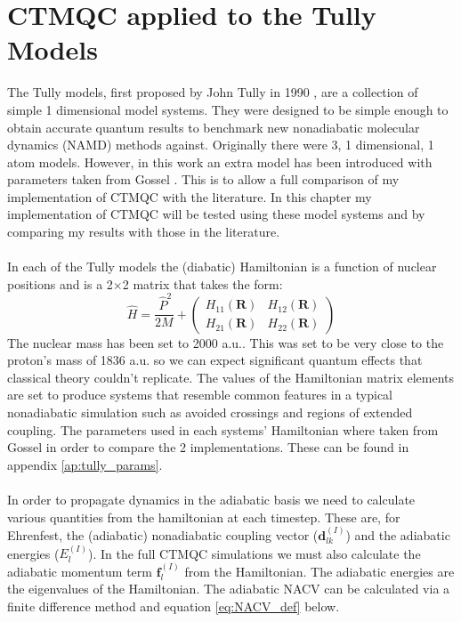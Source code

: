\chapter{CTMQC applied to the Tully Models}
\label{chap:tully_models}

The Tully models, first proposed by John Tully in 1990 \cite{tully_molecular_1990}, are a collection of simple 1 dimensional model systems. They were designed to be simple enough to obtain accurate quantum results to benchmark new nonadiabatic molecular dynamics (NAMD) methods against. Originally there were 3, 1 dimensional, 1 atom models. However, in this work an extra model has been introduced with parameters taken from Gossel \cite{gossel_coupled-trajectory_2018}. This is to allow a full comparison of my implementation of CTMQC with the literature. In this chapter my implementation of CTMQC will be tested using these model systems and by comparing my results with those in the literature.
\\\\
In each of the Tully models the (diabatic) Hamiltonian is a function of nuclear positions  and is a 2$\times$2 matrix that takes the form:
\begin{equation}
  \hat{H} = \frac{\ \hat{P} ^2}{2M} + \left(
                                              \begin{array}{cc}
                                                H_{11}(\mathbf{R}) & H_{12}(\mathbf{R}) \\
                                                H_{21}(\mathbf{R}) & H_{22}(\mathbf{R})
                                              \end{array}
                                         \right)
\end{equation}
The nuclear mass has been set to 2000 a.u.. This was set to be very close to the proton's mass of 1836 a.u. so we can expect significant quantum effects that classical theory couldn't replicate. The values of the Hamiltonian matrix elements are set to produce systems that resemble common features in a typical nonadiabatic simulation such as avoided crossings and regions of extended coupling. The parameters used in each systems' Hamiltonian where taken from Gossel \cite{gossel_coupled-trajectory_2018} in order to compare the 2 implementations. These can be found in appendix \ref{ap:tully_params}.
\\\\
In order to propagate dynamics in the adiabatic basis we need to calculate various quantities from the hamiltonian at each timestep. These are, for Ehrenfest, the (adiabatic) nonadiabatic coupling vector ($\mathbf{d}_{lk}^{(I)}$) and the adiabatic energies ($E_{l}^{(I)}$). In the full CTMQC simulations we must also calculate the adiabatic momentum term $\mathbf{f}_{l}^{(I)}$ from the Hamiltonian. The adiabatic energies are the eigenvalues of the Hamiltonian. The adiabatic NACV can be calculated via a finite difference method and equation \eqref{eq:NACV_def} below.
